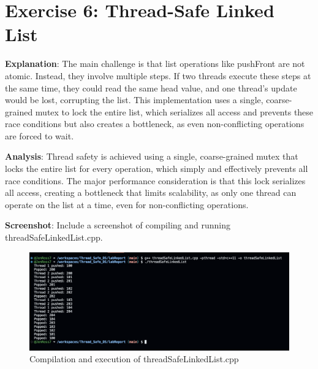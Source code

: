 \documentclass[a4paper]{article}
\begin{document}
\section{Exercise 6: Thread-Safe Linked List}

\textbf{Explanation}: The main challenge is that list operations like pushFront are not atomic. Instead, they involve multiple steps. If two threads execute these steps at the same time, they could read the same head value, and one thread's update would be lost, corrupting the list. This implementation uses a single, coarse-grained mutex to lock the entire list, which serializes all access and prevents these race conditions but also creates a bottleneck, as even non-conflicting operations are forced to wait.

\textbf{Analysis}: Thread safety is achieved using a single, coarse-grained mutex that locks the entire list for every operation, which simply and effectively prevents all race conditions. The major performance consideration is that this lock serializes all access, creating a bottleneck that limits scalability, as only one thread can operate on the list at a time, even for non-conflicting operations.

\textbf{Screenshot}: Include a screenshot of compiling and running threadSafeLinkedList.cpp.
\begin{figure}[H]
    \centering
    \includegraphics[width=\textwidth]{exercise6.png}
    \caption{Compilation and execution of threadSafeLinkedList.cpp}
\end{figure}
\end{document}
